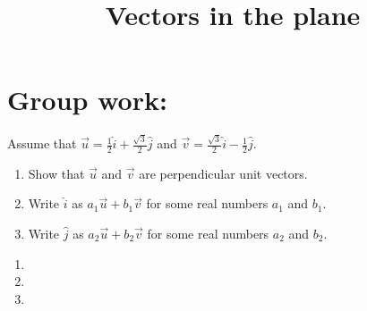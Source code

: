 \documentclass[]{ximera}
\title{Vectors in the plane}
\begin{document}
\begin{abstract}		\end{abstract}
\maketitle



\begin{comment}
\section{Warm up:}

	\begin{freeResponse}
	
	\end{freeResponse}
	
\begin{instructorNotes}

\end{instructorNotes}
\end{comment}







\section{Group work:}



\begin{problem}
Assume that $\vec{u} = \frac{1}{2} \hat{i} + \frac{\sqrt{3}}{2} \hat{j}$ and $\vec{v} = \frac{\sqrt{3}}{2} \hat{i} - \frac{1}{2} \hat{j}$.
	\begin{enumerate}
	\item  Show that $\vec{u}$ and $\vec{v}$ are perpendicular unit vectors.
	\item  Write $\hat{i}$ as $a_1 \vec{u} + b_1 \vec{v}$ for some real numbers $a_1$ and $b_1$.  
	\item  Write $\hat{j}$ as $a_2 \vec{u} + b_2 \vec{v}$ for some real numbers $a_2$ and $b_2$. 
	\end{enumerate}
	
	\begin{freeResponse}
	\begin{enumerate}
	\item  
	
	\item  
	
	\item  
	
	\end{enumerate}
	\end{freeResponse}
	
\end{problem}
\end{document}
